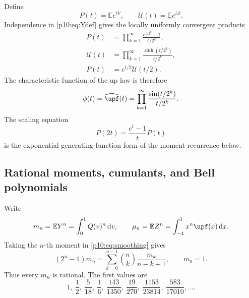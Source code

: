 \documentclass[11pt,oneside]{article}
\theoremstyle{definition}
\theoremstyle{remark}
\newcommand{\Q}{Q}
\newcommand{\E}{\mathbb E}
\newcommand{\dd}{\,\mathrm d}
\newcommand{\1}{\mathbf 1}
\begin{document}
Define
\begin{equation}\label{p10:eq:P-U-products}
 P(t)=\E e^{tY},\qquad \mathcal U(t)=\E e^{tZ}.
\end{equation}
Independence in \cref{p10:eq:Ydef} gives the locally uniformly convergent products
\begin{align}
 P(t)&=\prod_{k=1}^{\infty}
 \frac{e^{t/2^k}-1}{t/2^k},\label{p10:eq:P-product}\\
 \mathcal U(t)&=\prod_{k=1}^{\infty}
 \frac{\sinh(t/2^k)}{t/2^k},\label{p10:eq:U-product}\\
 P(t)&=e^{t/2}\mathcal U(t/2).\label{p10:eq:P-U-relation}
\end{align}
The characteristic function of the up law is therefore
\begin{equation}\label{p10:eq:phi-product}
 \phi(t)=\widehat{\upf}(t)
 =\prod_{k=1}^{\infty}\frac{\sin(t/2^k)}{t/2^k}.
\end{equation}
The scaling equation
\begin{equation}\label{p10:eq:P-pantograph}
 P(2t)=\frac{e^t-1}{t}P(t)
\end{equation}
is the exponential generating-function form of the moment recurrence below.

\subsection{Rational moments, cumulants, and Bell polynomials}

Write
\begin{equation}\label{p10:eq:mn-mun}
 m_n=\E Y^n=\int_0^1\Q(v)^n\dd v,
 \qquad
 \mu_n=\E Z^n=\int_{-1}^1x^n\upf(x)\dd x.
\end{equation}
Taking the \(n\)-th moment in \cref{p10:eq:smoothing} gives
\begin{equation}\label{p10:eq:moment-recurrence}
 (2^n-1)m_n
 =\sum_{k=0}^{n-1}\binom nk\frac{m_k}{n-k+1},
 \qquad m_0=1.
\end{equation}
Thus every \(m_n\) is rational.  The first values are
\begin{equation}\label{p10:eq:first-moments}
 1,\ \frac12,\ \frac5{18},\ \frac16,\ \frac{143}{1350},\
 \frac{19}{270},\ \frac{1153}{23814},\ \frac{583}{17010},\ldots.
\end{equation}
\end{document}
